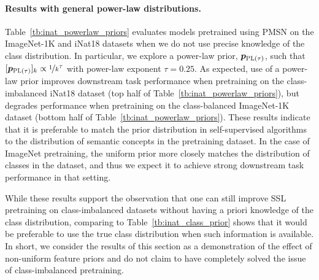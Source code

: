 \documentclass{article} %
\begin{document}
\paragraph{Results with general power-law distributions.}
Table~\ref{tb:inat_powerlaw_priors} evaluates models pretrained using PMSN on the ImageNet-1K and iNat18 datasets when we do not use precise knowledge of the class distribution.
In particular, we explore a power-law prior, ${\bm{p}}_{\text{\sc PL}(\tau)}$, such that $[{\bm{p}}_{\text{\sc PL}(\tau)}]_k \propto \nicefrac{1}{k}^\tau$ with power-law exponent $\tau = 0.25$.
As expected, use of a power-law prior improves downstream task performance when pretraining on the class-imbalanced iNat18 dataset (top half of Table~\ref{tb:inat_powerlaw_priors}), but degrades performance when pretraining on the class-balanced ImageNet-1K dataset (bottom half of Table~\ref{tb:inat_powerlaw_priors}).
These results indicate that it is preferable to match the prior distribution in self-supervised algorithms to the distribution of semantic concepts in the pretraining dataset.
In the case of ImageNet pretraining, the uniform prior more closely matches the distribution of classes in the dataset, and thus we expect it to achieve strong downstream task performance in that setting.

While these results support the observation that one can still improve SSL pretraining on class-imbalanced datasets without having a priori knowledge of the class distribution,  comparing to Table~\ref{tb:inat_class_prior} shows that it would be preferable to use the true class distribution when such information is available.
In short, we consider the results of this section as a demonstration of the effect of non-uniform feature priors and do not claim to have completely solved the issue of class-imbalanced pretraining.
\end{document}
